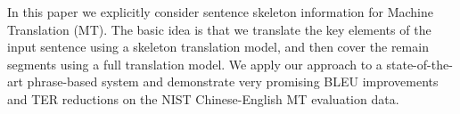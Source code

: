 In this paper we explicitly consider sentence skeleton information for Machine Translation (MT). The basic idea is that we translate the key elements of the input sentence using a skeleton translation model, and then cover the remain segments using a full translation model. We apply our approach to a state-of-the-art phrase-based system and demonstrate very promising BLEU improvements and TER reductions on the NIST Chinese-English MT evaluation data.
